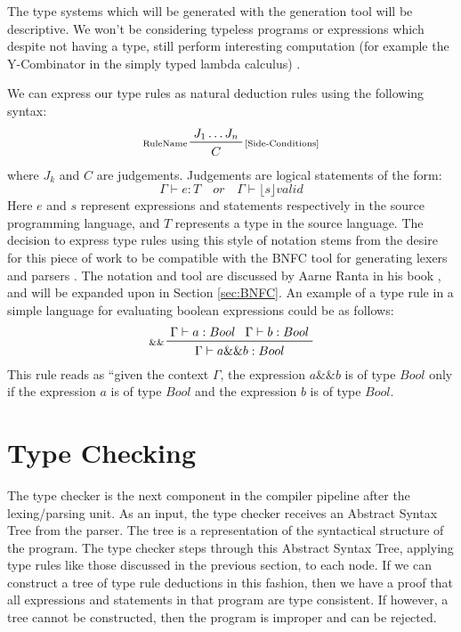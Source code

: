 \documentclass{UoYCSproject}
\begin{document}
The type systems which will be generated with the generation tool will be
descriptive. We won't be considering typeless programs or expressions which
despite not having a type, still perform interesting computation (for example
the Y-Combinator in the simply typed lambda calculus)\cite{NeilJones} \cite[p.~28]{SimonPeytonJones}
\cite[p.~155]{SimonPeytonJones}.

We can express our type rules as natural deduction rules using the following
syntax:
\begin{displaymath}
    \prftree[l,r]{\scriptsize [Side-Conditions]}{\scriptsize RuleName}{J_1 \dots J_n}{C}
\end{displaymath}
where $J_k$ and $C$ are judgements. Judgements are logical statements of the form:
\begin{displaymath}
    \Gamma \vdash e:T \quad or \quad \Gamma \vdash \lfloor s \rfloor valid
\end{displaymath}
Here $e$ and $s$ represent expressions and statements respectively in the source
programming language, and $T$ represents a type in the source language. The
decision to express type rules using this style of notation stems from the desire
for this piece of work to be compatible with the BNFC tool for generating lexers
and parsers \cite{BNFC}. The notation and tool are discussed by Aarne Ranta in
his book \cite{Ranta}, and will be expanded upon in Section \ref{sec:BNFC}. An example
of a type rule in a simple language for evaluating boolean expressions could be
as follows:
\begin{displaymath}
    \prftree[l]{\scriptsize \&\&}{\Gamma \vdash a:Bool}{\Gamma \vdash b:Bool}{\Gamma \vdash a \&\& b: Bool}
\end{displaymath}
This rule reads as ``given the context $\Gamma$, the expression $a \&\& b$
is of type $Bool$ only if the expression $a$ is of type $Bool$ and the expression $b$
is of type $Bool$.

\section{Type Checking}
\label{sec:Chap1TypeChecking}
The type checker is the next component in the compiler pipeline after the
lexing/parsing unit. As an input, the type checker receives an Abstract Syntax
Tree from the parser. The tree is a representation of the syntactical structure
of the program. The type checker steps through this Abstract Syntax Tree, applying
type rules like those discussed in the previous section, to each node. If we
can construct a tree of type rule deductions in this fashion, then we have a
proof that all expressions and statements in that program are type consistent.
If however, a tree cannot be constructed, then the program is improper and
can be rejected.
\end{document}
